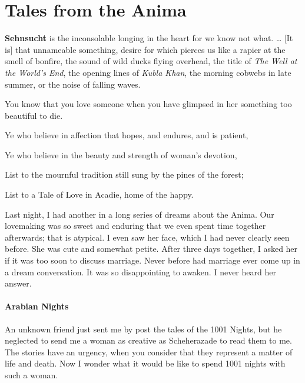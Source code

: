 \section{Tales from the Anima}

\begin{quotex}

\textbf{Sehnsucht} is the inconsolable longing in the heart for we know not what. … [It is] that unnameable something, desire for which pierces us like a rapier at the smell of bonfire, the sound of wild ducks flying overhead, the title of \emph{The Well at the World's End}, the opening lines of \emph{Kubla Khan}, the morning cobwebs in late summer, or the noise of falling waves. 

You know that you love someone when you have glimpsed in her something too beautiful to die. 

Ye who believe in affection that hopes, and endures, and is patient,

Ye who believe in the beauty and strength of woman's devotion,

List to the mournful tradition still sung by the pines of the forest;

List to a Tale of Love in Acadie, home of the happy. 

\end{quotex}
Last night, I had another in a long series of dreams about the Anima. Our lovemaking was so sweet and enduring that we even spent time together afterwards; that is atypical. I even saw her face, which I had never clearly seen before. She was cute and somewhat petite. After three days together, I asked her if it was too soon to discuss marriage. Never before had marriage ever come up in a dream conversation. It was so disappointing to awaken. I never heard her answer.

\paragraph{Arabian Nights}
An unknown friend just sent me by post the tales of the 1001 Nights, but he neglected to send me a woman as creative as Scheherazade to read them to me. The stories have an urgency, when you consider that they represent a matter of life and death. Now I wonder what it would be like to spend 1001 nights with such a woman.

